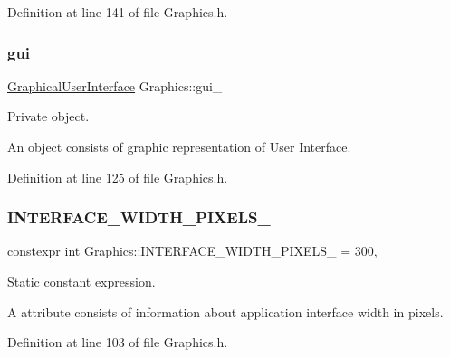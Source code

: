 Definition at line 141 of file Graphics.\+h.

\mbox{\label{classGraphics_ac582857f6b0de010eabd0146c4a5f4d2}} 
\subsubsection{\texorpdfstring{gui\+\_\+}{gui\_}}
{\footnotesize\ttfamily \hyperlink{classGraphicalUserInterface}{Graphical\+User\+Interface} Graphics\+::gui\+\_\+\hspace{0.3cm}{\ttfamily [private]}}



Private object. 

An object consists of graphic representation of User Interface. 

Definition at line 125 of file Graphics.\+h.

\mbox{\label{classGraphics_aac15ea113ea8c69d5e54996513886110}} 
\subsubsection{\texorpdfstring{I\+N\+T\+E\+R\+F\+A\+C\+E\+\_\+\+W\+I\+D\+T\+H\+\_\+\+P\+I\+X\+E\+L\+S\+\_\+}{INTERFACE\_WIDTH\_PIXELS\_}}
{\footnotesize\ttfamily constexpr int Graphics\+::\+I\+N\+T\+E\+R\+F\+A\+C\+E\+\_\+\+W\+I\+D\+T\+H\+\_\+\+P\+I\+X\+E\+L\+S\+\_\+ = 300\hspace{0.3cm}{\ttfamily [static]}, {\ttfamily [private]}}



Static constant expression. 

A attribute consists of information about application interface width in pixels. 

Definition at line 103 of file Graphics.\+h.

\mbox{\label{classGraphics_a7b3e98774ea965783584d5351c730276}} 
